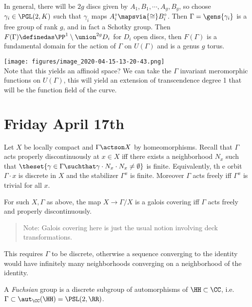 In general, there will be \(2g\) discs given by
\(A_1, B_1, \cdots, A_g, B_g\), so choose \(\gamma_i \in \PGL(2 ,K)\)
such that \(\gamma_i\) maps \(A_i^\circ \mapsvia{\cong} B_i^\circ\).
Then \(\Gamma = \gens{\gamma_i}\) is a free group of rank \(g\), and in
fact a Schotky group. Then
\(F(\Gamma) \definedas \PP^1 \setminus \union^{2g} D_i\) for \(D_i\)
open discs, then \(F(\Gamma)\) is a fundamental domain for the action of
\(\Gamma\) on \(U(\Gamma)\) and is a genus \(g\) torus.

\texttt{[image: figures/image\_2020-04-15-13-20-43.png]}\\

Note that this yields an affinoid space? We can take the \(\Gamma\)
invariant meromorphic functions on \(U(\Gamma)\), this will yield an
extension of transcendence degree 1 that will be the function field of
the curve.

\hypertarget{friday-april-17th}{%
\section{Friday April 17th}\label{friday-april-17th}}

Let \(X\) be locally compact and \(\Gamma \actson X\) by homeomorphisms.
Recall that \(\Gamma\) acts properly discontinuously at \(x\in X\) iff
there exists a neighborhood \(N_x\) such that
\(\theset{\gamma\in \Gamma \suchthat \gamma\cdot N_x \cdot N_x \neq \emptyset}\)
is finite. Equivalently, th e orbit \(\Gamma\cdot x\) is discrete in
\(X\) and the stabilizer \(\Gamma^x\) is finite. Moreover \(\Gamma\)
acts freely iff \(\Gamma^x\) is trivial for all \(x\).

\begin{description}
\tightlist
\item[Proposition]
For such \(X, \Gamma\) as above, the map \(X \to \Gamma/X\) is a galois
covering iff \(\Gamma\) acts freely and properly discontinuously.
\end{description}

\begin{quote}
Note: Galois covering here is just the usual notion involving deck
transformations.
\end{quote}

This requires \(\Gamma\) to be discrete, otherwise a sequence converging
to the identity would have infinitely many neighborhoods converging on a
neighborhood of the identity.

A \emph{Fuchsian} group is a discrete subgroup of automorphisms of
\(\HH \subset \CC\),
i.e.~\(\Gamma \subset \aut_\CC (\HH) = \PSL(2, \RR)\).

